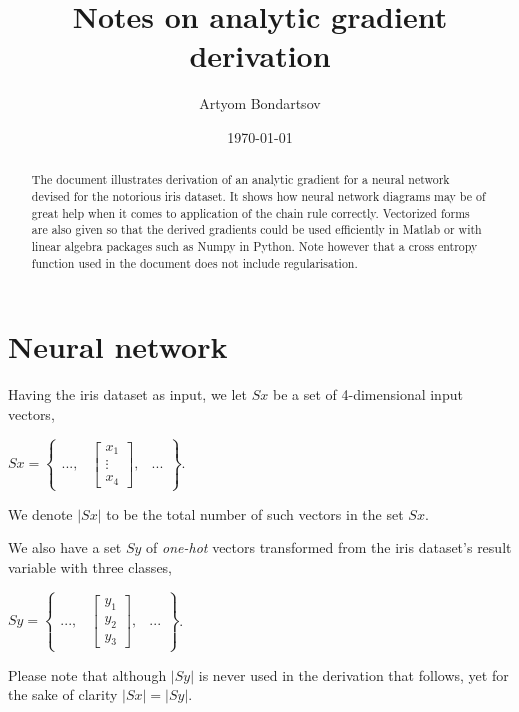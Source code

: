 \documentclass[a4paper,12pt,notitlepage]{article}
\title{Notes on analytic gradient derivation}
\author{Artyom Bondartsov}
\date{\today}
\begin{document}
\maketitle
\begin{abstract}
The document illustrates derivation of an analytic gradient for a neural network devised for the notorious iris dataset. It shows how neural network diagrams may be of great help when it comes to application of the chain rule correctly. Vectorized forms are also given so that the derived gradients could be used efficiently in Matlab or with linear algebra packages such as Numpy in Python. Note however that a cross entropy function used in the document does not include regularisation.
\end{abstract}

\section*{Neural network}
Having the iris dataset as input, we let $Sx$ be a set of 4-dimensional input vectors,
\begin{center}
$Sx=\begin{Bmatrix}
 ..., & \begin{bmatrix}
x_{1}\\ 
\vdots\\
x_{4} 
\end{bmatrix},&... 
\end{Bmatrix}$.
\end{center}
We denote $|Sx|$ to be the total number of such vectors in the set $Sx$.

We also have a set $Sy$ of \emph{one-hot} vectors transformed from the iris dataset's result variable with three classes, 
\begin{center}
 $Sy=\begin{Bmatrix}
 ..., & \begin{bmatrix}
y_{1}\\ 
y_{2}\\ 
y_{3} 

\end{bmatrix},&... 
\end{Bmatrix}$.
\end{center}
Please note that although $|Sy|$ is never used in the derivation that follows, yet for the sake of clarity $|Sx|=|Sy|$.
\end{document}
